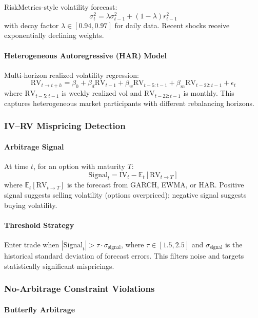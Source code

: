 RiskMetrics-style volatility forecast:
\[
\sigma_t^2 = \lambda \sigma_{t-1}^2 + (1 - \lambda) r_{t-1}^2
\]
with decay factor $\lambda \in [0.94, 0.97]$ for daily data. Recent shocks receive exponentially declining weights.

\paragraph{Heterogeneous Autoregressive (HAR) Model}

Multi-horizon realized volatility regression:
\[
\text{RV}_{t \to t+h} = \beta_0 + \beta_d \text{RV}_{t-1} + \beta_w \text{RV}_{t-5:t-1} + \beta_m \text{RV}_{t-22:t-1} + \epsilon_t
\]
where $\text{RV}_{t-5:t-1}$ is weekly realized vol and $\text{RV}_{t-22:t-1}$ is monthly. This captures heterogeneous market participants with different rebalancing horizons.

\subsubsection{IV--RV Mispricing Detection}

\paragraph{Arbitrage Signal}

At time $t$, for an option with maturity $T$:
\[
\text{Signal}_t = \text{IV}_t - \mathbb{E}_t[\text{RV}_{t \to T}]
\]
where $\mathbb{E}_t[\text{RV}_{t \to T}]$ is the forecast from GARCH, EWMA, or HAR. Positive signal suggests selling volatility (options overpriced); negative signal suggests buying volatility.

\paragraph{Threshold Strategy}

Enter trade when $|\text{Signal}_t| > \tau \cdot \sigma_{\text{signal}}$, where $\tau \in [1.5, 2.5]$ and $\sigma_{\text{signal}}$ is the historical standard deviation of forecast errors. This filters noise and targets statistically significant mispricings.

\subsubsection{No-Arbitrage Constraint Violations}

\paragraph{Butterfly Arbitrage}

